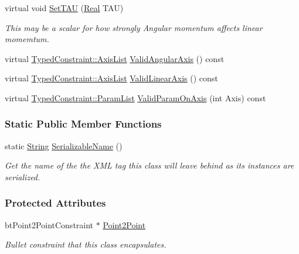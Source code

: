 \begin{DoxyCompactItemize}
virtual void \hyperlink{classMezzanine_1_1Point2PointConstraint_a9eba349fe0f12483330b9c309e305168}{SetTAU} (\hyperlink{namespaceMezzanine_a726731b1a7df72bf3583e4a97282c6f6}{Real} TAU)
\begin{DoxyCompactList}\small\item\em This may be a scalar for how strongly Angular momentum affects linear momemtum. \item\end{DoxyCompactList}\item 
virtual \hyperlink{classMezzanine_1_1TypedConstraint_ac6b8e0839cd686f73d0c9e9ad5db47a4}{TypedConstraint::AxisList} \hyperlink{classMezzanine_1_1Point2PointConstraint_a3398535453abbf5e573aec88669a41a6}{ValidAngularAxis} () const 
\item 
virtual \hyperlink{classMezzanine_1_1TypedConstraint_ac6b8e0839cd686f73d0c9e9ad5db47a4}{TypedConstraint::AxisList} \hyperlink{classMezzanine_1_1Point2PointConstraint_a3ee9d805802f459d6e418f4c0d9f83c1}{ValidLinearAxis} () const 
\item 
virtual \hyperlink{classMezzanine_1_1TypedConstraint_abd499db29c9e9755e9bb547d29eaa49a}{TypedConstraint::ParamList} \hyperlink{classMezzanine_1_1Point2PointConstraint_a3170aad8175d6c6c064e6d4e8e30cfa6}{ValidParamOnAxis} (int Axis) const 
\end{DoxyCompactItemize}
\subsubsection*{Static Public Member Functions}
\begin{DoxyCompactItemize}
\item 
static \hyperlink{namespaceMezzanine_acf9fcc130e6ebf08e3d8491aebcf1c86}{String} \hyperlink{classMezzanine_1_1Point2PointConstraint_a181517fd02b075cf28c61f9101044b97}{SerializableName} ()
\begin{DoxyCompactList}\small\item\em Get the name of the the XML tag this class will leave behind as its instances are serialized. \item\end{DoxyCompactList}\end{DoxyCompactItemize}
\subsubsection*{Protected Attributes}
\begin{DoxyCompactItemize}
\item 
\hypertarget{classMezzanine_1_1Point2PointConstraint_a96352d861e0cfd658c92551d1e174fba}{
btPoint2PointConstraint $\ast$ \hyperlink{classMezzanine_1_1Point2PointConstraint_a96352d861e0cfd658c92551d1e174fba}{Point2Point}}
\label{classMezzanine_1_1Point2PointConstraint_a96352d861e0cfd658c92551d1e174fba}

\begin{DoxyCompactList}\small\item\em Bullet constraint that this class encapsulates. \item\end{DoxyCompactList}\end{DoxyCompactItemize}


